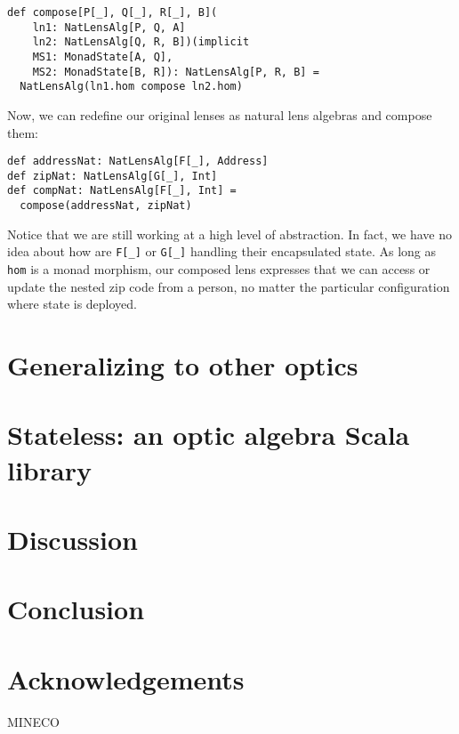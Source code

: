 \documentclass[final, twocolumn, 3p]{elsarticle}
\begin{document}
\begin{lstlisting}
def compose[P[_], Q[_], R[_], B](
    ln1: NatLensAlg[P, Q, A]
    ln2: NatLensAlg[Q, R, B])(implicit
    MS1: MonadState[A, Q],
    MS2: MonadState[B, R]): NatLensAlg[P, R, B] =
  NatLensAlg(ln1.hom compose ln2.hom)
\end{lstlisting}

Now, we can redefine our original lenses as natural lens algebras and compose
them:

\begin{lstlisting}
def addressNat: NatLensAlg[F[_], Address]
def zipNat: NatLensAlg[G[_], Int]
def compNat: NatLensAlg[F[_], Int] =
  compose(addressNat, zipNat)
\end{lstlisting}

Notice that we are still working at a high level of abstraction. In fact, we
have no idea about how are \lstinline{F[_]} or \lstinline{G[_]} handling their
encapsulated state. As long as \lstinline{hom} is a monad morphism, our
composed lens expresses that we can access or update the nested zip code from a
person, no matter the particular configuration where state is deployed.

\section{Generalizing to other optics}
\label{sec:Generalizing}

\section{Stateless: an optic algebra Scala library}
\label{sec:Stateless}

\section{Discussion}
\label{sec:Discussion}

\section{Conclusion}

\section*{Acknowledgements}
MINECO

{}

\end{document}
